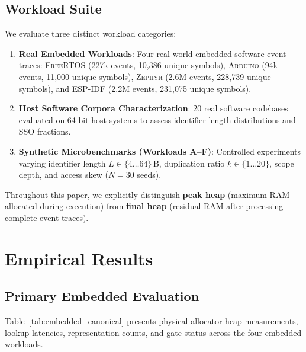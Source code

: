 \documentclass[conference]{IEEEtran}
\begin{document}
\subsection{Workload Suite}
We evaluate three distinct workload categories:
\begin{enumerate}
    \item \textbf{Real Embedded Workloads}: Four real-world embedded software event traces: \textsc{FreeRTOS} (227k events, 10,386 unique symbols), \textsc{Arduino} (94k events, 11,000 unique symbols), \textsc{Zephyr} (2.6M events, 228,739 unique symbols), and \textsc{ESP-IDF} (2.2M events, 231,075 unique symbols).
    \item \textbf{Host Software Corpora Characterization}: 20 real software codebases evaluated on 64-bit host systems to assess identifier length distributions and SSO fractions.
    \item \textbf{Synthetic Microbenchmarks (Workloads A--F)}: Controlled experiments varying identifier length $L \in \{4\dots 64\}$\,B, duplication ratio $k \in \{1\dots 20\}$, scope depth, and access skew ($N=30$ seeds).
\end{enumerate}

Throughout this paper, we explicitly distinguish \textbf{peak heap} (maximum RAM allocated during execution) from \textbf{final heap} (residual RAM after processing complete event traces).

\section{Empirical Results}

\subsection{Primary Embedded Evaluation}
Table~\ref{tab:embedded_canonical} presents physical allocator heap measurements, lookup latencies, representation counts, and gate status across the four embedded workloads.
\end{document}

